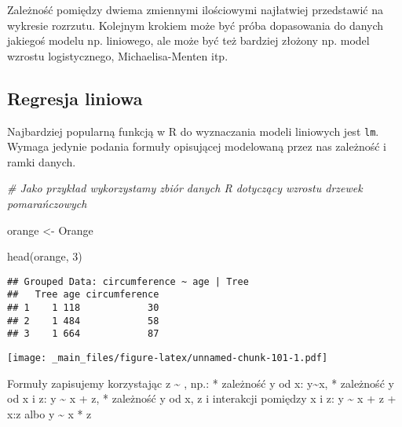 \documentclass[
]{book}
\newenvironment{Shaded}{\begin{snugshade}}{\end{snugshade}}
\newcommand{\AttributeTok}[1]{\textcolor[rgb]{0.77,0.63,0.00}{#1}}
\newcommand{\CommentTok}[1]{\textcolor[rgb]{0.56,0.35,0.01}{\textit{#1}}}
\newcommand{\DecValTok}[1]{\textcolor[rgb]{0.00,0.00,0.81}{#1}}
\newcommand{\FunctionTok}[1]{\textcolor[rgb]{0.00,0.00,0.00}{#1}}
\newcommand{\NormalTok}[1]{#1}
\newcommand{\OtherTok}[1]{\textcolor[rgb]{0.56,0.35,0.01}{#1}}
\newcommand{\SpecialCharTok}[1]{\textcolor[rgb]{0.00,0.00,0.00}{#1}}
\begin{document}
Zależność pomiędzy dwiema zmiennymi ilościowymi najłatwiej przedstawić na wykresie rozrzutu. Kolejnym krokiem może być próba dopasowania do danych jakiegoś modelu np. liniowego, ale może być też bardziej złożony np. model wzrostu logistycznego, Michaelisa-Menten itp.

\hypertarget{regresja-liniowa}{%
\subsection{Regresja liniowa}\label{regresja-liniowa}}

Najbardziej popularną funkcją w R do wyznaczania modeli liniowych jest \texttt{lm}. Wymaga jedynie podania formuły opisującej modelowaną przez nas zależność i ramki danych.

\begin{Shaded}
\begin{Highlighting}[]
\CommentTok{\# Jako przykład wykorzystamy zbiór danych R dotyczący wzrostu drzewek pomarańczowych}

\NormalTok{orange }\OtherTok{\textless{}{-}}\NormalTok{ Orange}

\FunctionTok{head}\NormalTok{(orange, }\DecValTok{3}\NormalTok{)}
\end{Highlighting}
\end{Shaded}

\begin{verbatim}
## Grouped Data: circumference ~ age | Tree
##   Tree age circumference
## 1    1 118            30
## 2    1 484            58
## 3    1 664            87
\end{verbatim}

\begin{Shaded}
\end{Shaded}

\texttt{[image: \_main\_files/figure-latex/unnamed-chunk-101-1.pdf]}

Formuły zapisujemy korzystając z \textasciitilde{} , np.:
* zależność y od x: y\textasciitilde x,
* zależność y od x i z: y \textasciitilde{} x + z,
* zależność y od x, z i interakcji pomiędzy x i z: y \textasciitilde{} x + z + x:z albo y \textasciitilde{} x * z

\begin{Shaded}
\end{Shaded}
\end{document}
